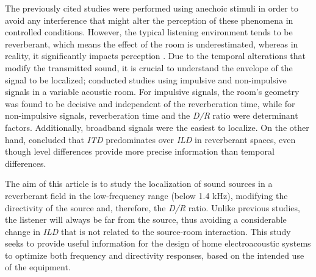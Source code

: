 The previously cited studies were performed using anechoic stimuli in order to avoid any interference that might alter the perception of these phenomena in controlled conditions. However, the typical listening environment tends to be reverberant, which means the effect of the room is underestimated, whereas in reality, it significantly impacts perception \parencite{rev1}. Due to the temporal alterations that modify the transmitted sound, it is crucial to understand the envelope of the signal to be localized; \textcite{Hartmann} conducted studies using impulsive and non-impulsive signals in a variable acoustic room. For impulsive signals, the room’s geometry was found to be decisive and independent of the reverberation time, while for non-impulsive signals, reverberation time and the \textit{D/R} ratio were determinant factors. Additionally, broadband signals were the easiest to localize. On the other hand, \textcite{espectrorev} concluded that \textit{ITD} predominates over \textit{ILD} in reverberant spaces, even though level differences provide more precise information than temporal differences.

The aim of this article is to study the localization of sound sources in a reverberant field in the low-frequency range (below 1.4 kHz), modifying the directivity of the source and, therefore, the \textit{D/R} ratio. Unlike previous studies, the listener will always be far from the source, thus avoiding a considerable change in \textit{ILD} that is not related to the source-room interaction. This study seeks to provide useful information for the design of home electroacoustic systems to optimize both frequency and directivity responses, based on the intended use of the equipment.
